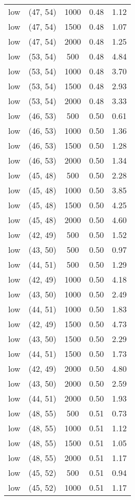 \begin{tabular}{c c c c c}
low & (47, 54) &  1000 & 0.48 & 1.12 \\
low & (47, 54) &  1500 & 0.48 & 1.07 \\
low & (47, 54) &  2000 & 0.48 & 1.25 \\
low & (53, 54) &  500 & 0.48 & 4.84 \\
low & (53, 54) &  1000 & 0.48 & 3.70 \\
low & (53, 54) &  1500 & 0.48 & 2.93 \\
low & (53, 54) &  2000 & 0.48 & 3.33 \\
low & (46, 53) &  500 & 0.50 & 0.61 \\
low & (46, 53) &  1000 & 0.50 & 1.36 \\
low & (46, 53) &  1500 & 0.50 & 1.28 \\
low & (46, 53) &  2000 & 0.50 & 1.34 \\
low & (45, 48) &  500 & 0.50 & 2.28 \\
low & (45, 48) &  1000 & 0.50 & 3.85 \\
low & (45, 48) &  1500 & 0.50 & 4.25 \\
low & (45, 48) &  2000 & 0.50 & 4.60 \\
low & (42, 49) &  500 & 0.50 & 1.52 \\
low & (43, 50) &  500 & 0.50 & 0.97 \\
low & (44, 51) &  500 & 0.50 & 1.29 \\
low & (42, 49) &  1000 & 0.50 & 4.18 \\
low & (43, 50) &  1000 & 0.50 & 2.49 \\
low & (44, 51) &  1000 & 0.50 & 1.83 \\
low & (42, 49) &  1500 & 0.50 & 4.73 \\
low & (43, 50) &  1500 & 0.50 & 2.29 \\
low & (44, 51) &  1500 & 0.50 & 1.73 \\
low & (42, 49) &  2000 & 0.50 & 4.80 \\
low & (43, 50) &  2000 & 0.50 & 2.59 \\
low & (44, 51) &  2000 & 0.50 & 1.93 \\
low & (48, 55) &  500 & 0.51 & 0.73 \\
low & (48, 55) &  1000 & 0.51 & 1.12 \\
low & (48, 55) &  1500 & 0.51 & 1.05 \\
low & (48, 55) &  2000 & 0.51 & 1.17 \\
low & (45, 52) &  500 & 0.51 & 0.94 \\
low & (45, 52) &  1000 & 0.51 & 1.17 \\

\end{tabular}
